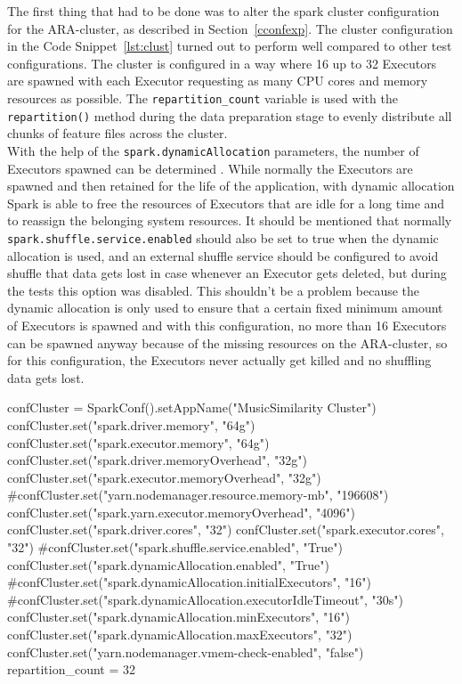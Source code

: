 \noindent The first thing that had to be done was to alter the spark cluster configuration for the ARA-cluster, as described in Section~\ref{cconfexp}.
\noindent The cluster configuration in the Code Snippet~\ref{lst:clust} turned out to perform well compared to other test configurations. The cluster is configured in a way where 16 up to 32 Executors are spawned with each Executor requesting as many CPU cores and memory resources as possible. The \lstinline{repartition_count} variable is used with the \lstinline{repartition()} method during the data preparation stage to evenly distribute all chunks of feature files across the cluster.\\
\noindent With the help of the \lstinline{spark.dynamicAllocation} parameters, the number of Executors spawned can be determined \cite[p. 153]{sparkbook1}. While normally the Executors are spawned and then retained for the life of the application, with dynamic allocation Spark is able to free the resources of Executors that are idle for a long time and to reassign the belonging system resources. 
It should be mentioned that normally \lstinline{spark.shuffle.service.enabled} should also be set to true when the dynamic allocation is used, and an external shuffle service should be configured to avoid shuffle that data gets lost in case whenever an Executor gets deleted, but during the tests this option was disabled. This shouldn't be a problem because the dynamic allocation is only used to ensure that a certain fixed minimum amount of Executors is spawned and with this configuration, no more than 16 Executors can be spawned anyway because of the missing resources on the ARA-cluster, so for this configuration, the Executors never actually get killed and no shuffling data gets lost.\\

\begin{pythonCode}[frame=single,label={lst:clust},caption={Cluster setup},captionpos=b]
confCluster = SparkConf().setAppName("MusicSimilarity Cluster")
confCluster.set("spark.driver.memory", "64g")
confCluster.set("spark.executor.memory", "64g")
confCluster.set("spark.driver.memoryOverhead", "32g")
confCluster.set("spark.executor.memoryOverhead", "32g")
#confCluster.set("yarn.nodemanager.resource.memory-mb", "196608")
confCluster.set("spark.yarn.executor.memoryOverhead", "4096")
confCluster.set("spark.driver.cores", "32")
confCluster.set("spark.executor.cores", "32")
#confCluster.set("spark.shuffle.service.enabled", "True")
confCluster.set("spark.dynamicAllocation.enabled", "True")
#confCluster.set("spark.dynamicAllocation.initialExecutors", "16")
#confCluster.set("spark.dynamicAllocation.executorIdleTimeout", "30s")	
confCluster.set("spark.dynamicAllocation.minExecutors", "16")
confCluster.set("spark.dynamicAllocation.maxExecutors", "32")
confCluster.set("yarn.nodemanager.vmem-check-enabled", "false")
repartition_count = 32
\end{pythonCode}

